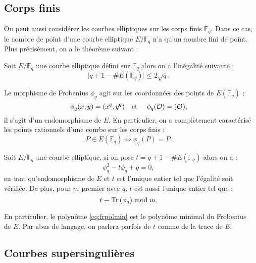 \documentclass[a4paper]{article} %
\numberwithin{section}{part}
\numberwithin{equation}{section}
\newcommand\GF[1]{\mathbb{F}_{#1}}
\newcommand\Tr[1]{\textup{Tr}\left(#1\right)}
\newcommand\EO{\mathcal{O}}
\newcommand\etmath{\textup{\quad et \quad}}
\begin{document}
\subsection{Corps finis}
On peut aussi considérer les courbes elliptiques sur les corps finis $\GF{q}$.
Dans ce cas, le nombre de point d'une courbe elliptique $E/\GF{q}$ n'a qu'un
nombre fini de point. Plus précisément, on a le théorème suivant :
\begin{thm}[Hasse]
\label{th:hasse}
Soit $E/\GF{q}$ une courbe elliptique défini sur $\GF{q}$ alors on a l'inégalité
suivante :
\begin{equation}
\vert{q + 1 - \#E(\GF{q})}\vert\leq 2\sqrt{q}.
\end{equation}
\end{thm}
Le morphisme de Frobenius $\phi_q$ agit sur les coordonnées des points de
$E(\overline{\mathbb{F}}_q)$ :
\begin{equation}
\phi_q(x,y) = (x^q, y^q)\etmath \phi_q(\EO) = (\EO),
\end{equation}
il s'agit d'un endomorphisme de $E$. En particulier, on a complètement 
caractérisé les points rationnels d'une courbe sur les corps finis :
\begin{equation}
P\in E(\GF{q}) \Leftrightarrow \phi_q(P) = P.
\end{equation}
\begin{prop}
Soit $E/\GF{q}$ une courbe elliptique, si on pose $t = q + 1 - \#E(\GF{q})$
alors on a :
\begin{equation}
\label{eq:frpolmin}
\phi_q^2 - t\phi_q + q = 0,
\end{equation}
en tant qu'endomorphisme de $E$ et $t$ est l'unique entier tel que l'égalité
soit vérifiée. De plus, pour $m$ premier avec $q$, $t$ est aussi l'unique entier
tel que :
\begin{equation}
t \equiv \Tr{\phi_q} \bmod m.
\end{equation}
\end{prop}
En particulier, le polynôme \ref{eq:frpolmin} est le polynôme minimal du
Frobenius de $E$. Par abus de langage, on parlera parfois de $t$ comme de la 
trace de $E$.

\subsection{Courbes supersingulières}
\end{document}
